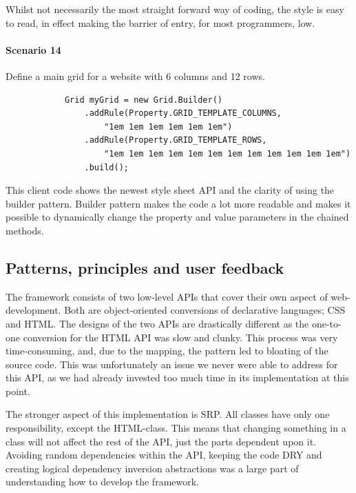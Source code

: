\documentclass[12pt]{article}
\begin{document}
    Whilst not necessarily the most straight forward way of coding, the style is easy to read, in effect making the barrier of entry, for most programmers, low.

    \paragraph{Scenario 14}
    Define a main grid for a website with 6 columns and 12 rows.

    \begin{shaded}
        \begin{lstlisting}
            Grid myGrid = new Grid.Builder()
                .addRule(Property.GRID_TEMPLATE_COLUMNS,
                    "1em 1em 1em 1em 1em 1em")
                .addRule(Property.GRID_TEMPLATE_ROWS,
                    "1em 1em 1em 1em 1em 1em 1em 1em 1em 1em 1em 1em")
                .build();
        \end{lstlisting}
    \end{shaded}

    This client code shows the newest style sheet API and the clarity of using the builder pattern. Builder pattern makes the code a lot more readable and makes it possible to dynamically change the property and value parameters in the chained methods. 

    \subsection{Patterns, principles and user feedback}

    The framework consists of two low-level APIs that cover their own aspect of web-development. Both are object-oriented conversions of declarative languages; CSS and HTML. The designs of the two APIs are drastically different as the one-to-one conversion for the HTML API was slow and clunky. This process was very time-consuming, and, due to the mapping, the pattern led to bloating of the source code. This was unfortunately an issue we never were able to address for this API, as we had already invested too much time in its implementation at this point.

    The stronger aspect of this implementation is SRP. All classes have only one responsibility, except the HTML-class. This means that changing something in a class will not affect the rest of the API, just the parts dependent upon it. Avoiding random dependencies within the API, keeping the code DRY and creating logical dependency inversion abstractions was a large part of understanding how to develop the framework.
\end{document}
